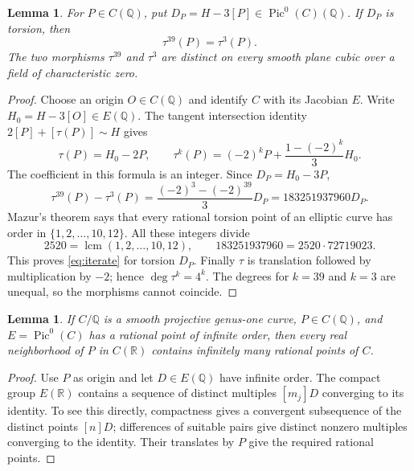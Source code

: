 \documentclass[11pt]{article}
\newtheorem{lemma}[theorem]{Lemma}
\theoremstyle{remark}\newtheorem{remark}[theorem]{Remark}
\newcommand{\Q}{\mathbb Q}\newcommand{\R}{\mathbb R}
\begin{document}
\begin{lemma}\label{lem:torsion}
For $P\in C(\Q)$, put $D_P=H-3[P]\in\operatorname{Pic}^0(C)(\Q)$.
If $D_P$ is torsion, then
\begin{equation}\label{eq:iterate}
\tau^{39}(P)=\tau^3(P).
\end{equation}
The two morphisms $\tau^{39}$ and $\tau^3$ are distinct on every smooth
plane cubic over a field of characteristic zero.
\end{lemma}

\begin{proof}
Choose an origin $O\in C(\Q)$ and identify $C$ with its Jacobian $E$.
Write $H_0=H-3[O]\in E(\Q)$.  The tangent intersection identity
$2[P]+[\tau(P)]\sim H$ gives
\[
\tau(P)=H_0-2P,
\qquad
\tau^k(P)=(-2)^kP+\frac{1-(-2)^k}{3}H_0.
\]
The coefficient in this formula is an integer.  Since $D_P=H_0-3P$,
\[
\tau^{39}(P)-\tau^3(P)
 =\frac{(-2)^3-(-2)^{39}}3D_P
 =183251937960D_P.
\]
Mazur's theorem \cite[Theorem~(7$'$)]{Mazur} says that every rational
torsion point of an elliptic curve has order in
$\{1,2,\ldots,10,12\}$.  All these integers divide
\[
2520=\operatorname{lcm}(1,2,\ldots,10,12),
\qquad
183251937960=2520\cdot72719023.
\]
This proves \eqref{eq:iterate} for torsion $D_P$.
Finally $\tau$ is translation followed by multiplication by $-2$; hence
$\deg\tau^k=4^k$.  The degrees for $k=39$ and $k=3$ are unequal, so
the morphisms cannot coincide.
\end{proof}

\begin{lemma}\label{lem:near}
If $C/\Q$ is a smooth projective genus-one curve, $P\in C(\Q)$, and
$E=\operatorname{Pic}^0(C)$ has a rational point of infinite order, then
every real neighborhood of $P$ in $C(\R)$ contains infinitely many
rational points of $C$.
\end{lemma}

\begin{proof}
Use $P$ as origin and let $D\in E(\Q)$ have infinite order.
The compact group $E(\R)$ contains a sequence of distinct multiples
$[m_j]D$ converging to its identity.  To see this directly, compactness
gives a convergent subsequence of the distinct points $[n]D$; differences
of suitable pairs give distinct nonzero multiples converging to the
identity.  Their translates by $P$ give the required rational points.
\end{proof}
\end{document}
